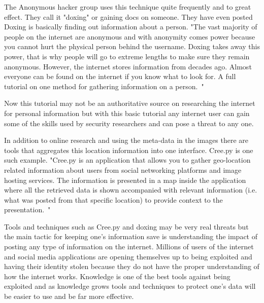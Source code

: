 The Anonymous hacker group uses this technique quite frequently and to great
effect. They call it "doxing" or gaining docs on someone. They have even posted
Doxing is basically finding out information about a person. "The vast majority
of people on the internet are anonymous and with anonymity comes power because
you cannot hurt the physical person behind the username. Doxing takes away this
power, that is why people will go to extreme lengths to make sure they remain
anonymous.  However, the internet stores information from decades ago. Almost
everyone can be found on the internet if you know what to look for. A full
tutorial on one method for gathering information on a person.~\cite{doxing}"

Now this tutorial may not be an authoritative source on researching the internet
for personal information but with this basic tutorial any internet user can gain
some of the skills used by security researchers and can pose a threat to any
one.

In addition to online research and using the meta-data in the images there are
tools that aggregates this location information into one interface. Cree.py is
one such example. "Cree.py is an application that allows you to gather
geo-location related information about users from social networking platforms
and image hosting services. The information is presented in a map inside the
application where all the retrieved data is shown accompanied with relevant
information (i.e. what was posted from that specific location) to provide
context to the presentation.~\cite{creepy}"

Tools and techniques such as Cree.py and doxing may be very real threats but the
main tactic for keeping one's information save is understanding the impact of
posting any type of information on the internet. Millions of users of the
internet and social media applications are opening themselves up to being
exploited and having their identity stolen because they do not have the proper
understanding of how the internet works. Knowledge is one of the best tools
against being exploited and as knowledge grows tools and techniques to protect
one's data will be easier to use and be far more effective.
